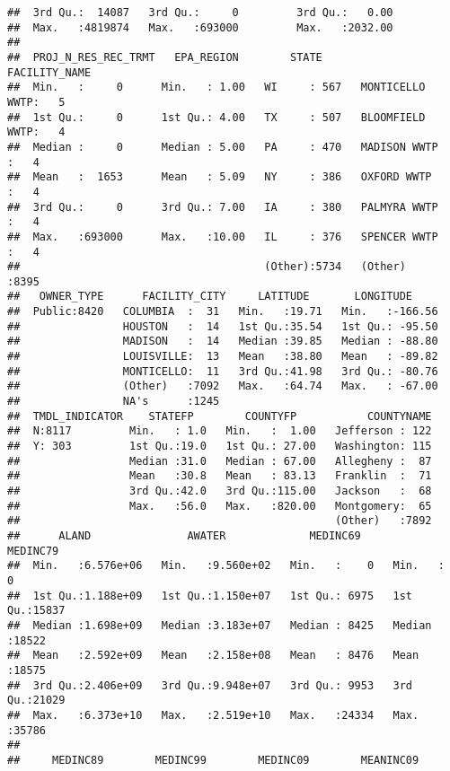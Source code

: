 \documentclass[]{article}
\begin{document}
\begin{verbatim}
##  3rd Qu.:  14087   3rd Qu.:     0         3rd Qu.:   0.00  
##  Max.   :4819874   Max.   :693000         Max.   :2032.00  
##                                                            
##  PROJ_N_RES_REC_TRMT   EPA_REGION        STATE              FACILITY_NAME 
##  Min.   :     0      Min.   : 1.00   WI     : 567   MONTICELLO WWTP:   5  
##  1st Qu.:     0      1st Qu.: 4.00   TX     : 507   BLOOMFIELD WWTP:   4  
##  Median :     0      Median : 5.00   PA     : 470   MADISON WWTP   :   4  
##  Mean   :  1653      Mean   : 5.09   NY     : 386   OXFORD WWTP    :   4  
##  3rd Qu.:     0      3rd Qu.: 7.00   IA     : 380   PALMYRA WWTP   :   4  
##  Max.   :693000      Max.   :10.00   IL     : 376   SPENCER WWTP   :   4  
##                                      (Other):5734   (Other)        :8395  
##   OWNER_TYPE      FACILITY_CITY     LATITUDE       LONGITUDE      
##  Public:8420   COLUMBIA  :  31   Min.   :19.71   Min.   :-166.56  
##                HOUSTON   :  14   1st Qu.:35.54   1st Qu.: -95.50  
##                MADISON   :  14   Median :39.85   Median : -88.80  
##                LOUISVILLE:  13   Mean   :38.80   Mean   : -89.82  
##                MONTICELLO:  11   3rd Qu.:41.98   3rd Qu.: -80.76  
##                (Other)   :7092   Max.   :64.74   Max.   : -67.00  
##                NA's      :1245                                    
##  TMDL_INDICATOR    STATEFP        COUNTYFP           COUNTYNAME  
##  N:8117         Min.   : 1.0   Min.   :  1.00   Jefferson : 122  
##  Y: 303         1st Qu.:19.0   1st Qu.: 27.00   Washington: 115  
##                 Median :31.0   Median : 67.00   Allegheny :  87  
##                 Mean   :30.8   Mean   : 83.13   Franklin  :  71  
##                 3rd Qu.:42.0   3rd Qu.:115.00   Jackson   :  68  
##                 Max.   :56.0   Max.   :820.00   Montgomery:  65  
##                                                 (Other)   :7892  
##      ALAND               AWATER             MEDINC69        MEDINC79    
##  Min.   :6.576e+06   Min.   :9.560e+02   Min.   :    0   Min.   :    0  
##  1st Qu.:1.188e+09   1st Qu.:1.150e+07   1st Qu.: 6975   1st Qu.:15837  
##  Median :1.698e+09   Median :3.183e+07   Median : 8425   Median :18522  
##  Mean   :2.592e+09   Mean   :2.158e+08   Mean   : 8476   Mean   :18575  
##  3rd Qu.:2.406e+09   3rd Qu.:9.948e+07   3rd Qu.: 9953   3rd Qu.:21029  
##  Max.   :6.373e+10   Max.   :2.519e+10   Max.   :24334   Max.   :35786  
##                                                                         
##     MEDINC89        MEDINC99        MEDINC09        MEANINC09     

\end{verbatim}
\end{document}
